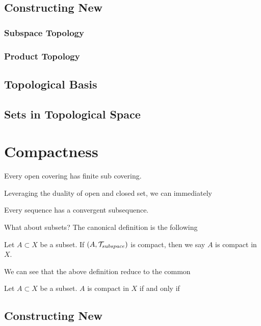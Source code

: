 \subsection{Constructing New }

\subsubsection{Subspace Topology}

\subsubsection{Product Topology}

\subsection{Topological Basis}


\subsection{Sets in Topological Space}


\section{Compactness}



\begin{definition}[Compact]
    Every open covering has finite sub covering.
\end{definition}
Leveraging the duality of open and closed set, we can immediately

\begin{definition}
    Every sequence has a convergent subsequence.
\end{definition}

What about subsets? The canonical definition is the following
\begin{remark}
    Let $A\subset X$ be a subset. If $(A,\mathcal{T}_{subspace})$ is compact, then we say $A$ is compact in $X$.
\end{remark}

We can see that the above definition reduce to the common 
\begin{proposition}
    Let $A\subset X$ be a subset. $A$ is compact in $X$ if and only if 
\end{proposition}


\subsection{Constructing New}

